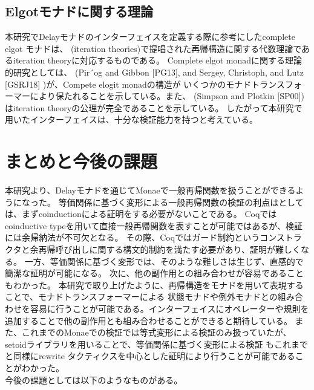 \documentclass[japanese]{jssst_ppl}
\theoremstyle{definition}
\begin{document}
\subsection{Elgotモナドに関する理論}
本研究でDelayモナドのインターフェイスを定義する際に参考にしたcomplete elgot モナドは、
(iteration theories)で提唱された再帰構造に関する代数理論であるiteration theoryに対応するものである。
Complete elgot monadに関する理論的研究としては、
(Pir´og and Gibbon [PG13], and Sergey, Christoph, and Lutz [GSRJ18] )が、Compete elogit monadの構造が
いくつかのモナドトランスフォーマーにより保たれることを示している。また、
(Simpson and Plotkin [SP00])はiteration theoryの公理が完全であることを示している。
したがって本研究で用いたインターフェイスは、十分な検証能力を持つと考えている。



\section{まとめと今後の課題}
本研究より、Delayモナドを通じてMonaeで一般再帰関数を扱うことができるようになった。
等価関係に基づく変形による一般再帰関数の検証の利点はとしては、まずcoinductionによる証明をする必要がないことである。
Coqではcoinductive typeを用いて直接一般再帰関数を表すことが可能ではあるが、検証には余帰納法が不可欠となる。
その際、Coqではガード制約というコンストラクタと余再帰呼び出しに関する構文的制約を満たす必要があり、証明が難しくなる。
一方、等価関係に基づく変形では、そのような難しさは生じず、直感的で簡潔な証明が可能になる。
次に、他の副作用との組み合わせが容易であることもわかった。
本研究で取り上げたように、再帰構造をモナドを用いて表現することで、モナドトランスフォーマーによる
状態モナドや例外モナドとの組み合わせを容易に行うことが可能である。インターフェイスにオペレーターや規則を追加することで他の副作用とも組み合わせることができると期待している。
また、これまでのMonaeでの検証では等式変形による検証のみ扱っていたが、setoidライブラリを用いることで、等価関係に基づく変形による検証
もこれまでと同様にrewrite タクティクスを中心とした証明により行うことが可能であることがわかった。\\
今後の課題としては以下のようなものがある。
\end{document}
